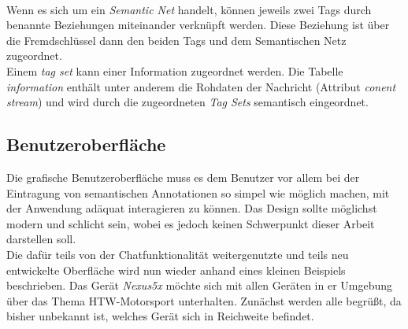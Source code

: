 \\Wenn es sich um ein \textit{Semantic Net} handelt, können jeweils zwei Tags durch benannte Beziehungen miteinander verknüpft werden. Diese Beziehung ist über die Fremdschlüssel dann den beiden Tags und dem Semantischen Netz zugeordnet. 
\\Einem \textit{tag set} kann einer Information zugeordnet werden. Die Tabelle \textit{information} enthält unter anderem die Rohdaten der Nachricht (Attribut \textit{conent stream}) und wird durch die zugeordneten \textit{Tag Sets} semantisch eingeordnet. 
\newline [...]
\newpage

\subsection{Benutzeroberfläche}
Die grafische Benutzeroberfläche muss es dem Benutzer vor allem bei der Eintragung von semantischen Annotationen so simpel wie möglich machen, mit der Anwendung adäquat interagieren zu können. Das Design sollte möglichst modern und schlicht sein, wobei es jedoch keinen Schwerpunkt dieser Arbeit darstellen soll. 
\\Die dafür teils von der Chatfunktionalität weitergenutzte und teils neu entwickelte Ober\-flä\-che wird nun wieder anhand eines kleinen Beispiels beschrieben. Das Gerät \textit{Nexus5x} möchte sich mit allen Geräten in er Umgebung über das Thema HTW-Motorsport unterhalten. Zunächst werden alle begrüßt, da bisher unbekannt ist, welches Gerät sich in Reichweite befindet.\newline\newline
\hspace*{0cm}
